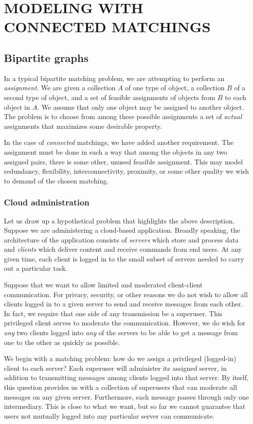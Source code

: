 \chapter{MODELING WITH CONNECTED MATCHINGS}


\section{Bipartite graphs}
	In a typical bipartite matching problem, we are attempting to perform an {\it assignment}.  We are given a collection $A$ of one type of object, a collection $B$ of a second type of object, and a set of feasible assignments
of objects from $B$ to each object in $A$.  We assume that only one object may be assigned to another object.  The problem is to choose from among these possible assignments a set of {\it actual} assignments that maximizes some desirable property.
	
	In the case of {\it connected} matchings, we have added another requirement.  The assignment must be done in such a way that among the objects in any two assigned pairs, there is some other, unused feasible assignment.  This may model redundancy, flexibility, interconnectivity, proximity, or some other quality we wish to demand of the chosen matching.   
	\subsection{Cloud administration}

	Let us draw up a hypothetical problem that highlights the above description.  Suppose we are administering a cloud-based application. Broadly speaking, the architecture of the application consists of {\it servers} which store and process data and {\it clients} which deliver content and receive commands from end users.  At any given time, each client is logged in to the small subset of servers needed to carry out a particular task.

Suppose that we want to allow limited and moderated client-client communication.  For privacy, security, or other reasons we do not wish to allow all clients logged in to a given server to send and receive messages from each other.  In fact, we require that one side of any transmission be a superuser.   This privileged client serves to moderate the communication.  However, we do wish for {\it any} two clients logged into {\it any} of the servers to be able to get a message from one to the other as quickly as possible. 

We begin with a matching problem: how do we assign a privileged (logged-in) client to each server?  Each superuser will administer its assigned server, in addition to transmitting messages among clients logged into that server.  By itself, this question provides us with a collection of superusers that can moderate all messages on any given server.  Furthermore, each message passes through only one intermediary.  This is close to what we want, but so far we cannot guarantee that users not mutually logged into any particular server can communicate.

